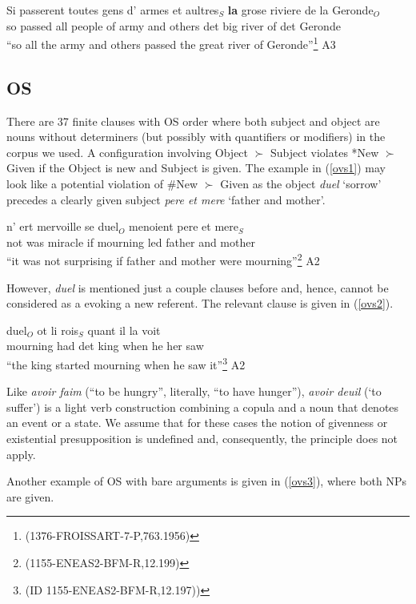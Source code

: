 \documentclass[output=paper,modfonts,nonflat]{langsci/langscibook}
\begin{document}
\ea
\gll Si passerent toutes gens d' armes et aultres$_{S}$ {\bf la} grose riviere de la Geronde$_{O}$\\
so passed all people of army and others {\sc det} big river of {\sc det} Geronde\\ 
\glt ``so all the army and others passed the great river of Geronde''\footnote{\scriptsize{(1376-FROISSART-7-P,763.1956)}}\label{vso2} \hfill A3
\z

\subsection{OS}
 
There are 37 finite clauses with OS order where both subject and object are nouns without determiners (but possibly with quantifiers or modifiers) in the corpus we used. A configuration involving Object $\succ$ Subject violates *New $\succ$ Given if the Object is new and Subject is given. The example in (\ref{ovs1}) may look like a potential violation of \#New $\succ$ Given as the object {\it duel} `sorrow' precedes a clearly given subject {\it pere et mere} `father and mother'. 

\ea
\gll n' ert mervoille se duel$_{O}$ menoient pere et mere$_{S}$\\
not was miracle if mourning led father and mother\\
\glt ``it was not surprising if father and mother were mourning''\footnote{\scriptsize{(1155-ENEAS2-BFM-R,12.199)}}\label{ovs1} \hfill A2
\z

However, {\it duel} is mentioned just a couple clauses before and, hence, cannot be considered as a evoking a new referent. The relevant clause is given in (\ref{ovs2}). 

\ea
\gll duel$_{O}$ ot li rois$_{S}$ quant il la voit\\
mourning had {\sc det} king when he her saw\\
\glt ``the king started mourning when he saw it''\footnote{\scriptsize{(ID 1155-ENEAS2-BFM-R,12.197))}}\label{ovs2} \hfill A2
\z

Like {\it avoir faim} (``to be hungry'', literally, ``to have hunger''), {\it avoir deuil} (`to suffer') is a light verb construction combining a copula and a noun that denotes an event or a state. We assume that for these cases the notion of givenness or existential presupposition is undefined and, consequently, the principle does not apply.

Another example of OS with bare arguments is given in (\ref{ovs3}), where both NPs are given.
\end{document}
